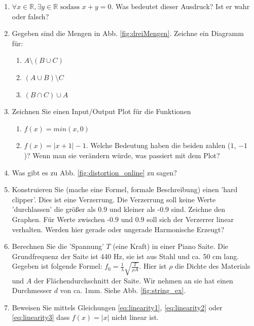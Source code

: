 \begin{enumerate}
    \item $\forall x \in \mathbb{R}, \exists y \in \mathbb{R} \text{ sodass } x + y = 0$. Was bedeutet dieser Ausdruck? Ist er wahr oder falsch?
    \item Gegeben sind die Mengen in Abb. \ref{fig:dreiMengen}. Zeichne ein Diagramm für:
    \begin{enumerate} %
        \item $A \setminus (B \cup C)$
        \item $(A \cup B) \setminus C$
        \item $(B \cap C) \cup A$
    \end{enumerate}
    \item Zeichnen Sie einen Input/Output Plot für die Funktionen 
    \begin{enumerate} %
        \item $f(x) = min(x, 0)$
        \item $f(x) = |x+1|-1$. Welche Bedeutung haben die beiden zahlen ($1$, $-1$ )? Wenn man sie verändern würde, was passiert mit dem Plot?
    \end{enumerate}
    \item Was gibt es zu Abb. \ref{fig:distortion_online} zu sagen?
    \item Konstruieren Sie (mache eine Formel, formale Beschreibung) einen 'hard clipper'. Dies ist eine Verzerrung. Die Verzerrung soll keine Werte 'durchlassen' die größer als 0.9 und kleiner als -0.9 sind. Zeichne den Graphen. Für Werte zwischen -0.9 und 0.9 soll sich der Verzerrer linear verhalten. Werden hier gerade oder ungerade Harmonische Erzeugt?
    \item Berechnen Sie die 'Spannung' $T$ (eine Kraft) in einer Piano Saite. Die Grundfrequenz der Saite ist 440 Hz, sie ist aus Stahl und ca. 50 cm lang. Gegeben ist folgende Formel: $f_0 = \frac{1}{\lambda} \sqrt{\frac{T}{\rho A}}$. Hier ist $\rho$ die Dichte des Materials und $A$ der Flächendurchschnitt der Saite. Wir nehmen an sie hat einen Durchmesser $d$ von ca. 1mm. Siehe Abb. \ref{fig:string_ex}.

    \item Beweisen Sie mittels Gleichungen \ref{eq:linearity1}, \ref{eq:linearity2} oder \ref{eq:linearity3} dass $f(x)=|x|$ nicht linear ist.


\end{enumerate}

